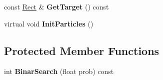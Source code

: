 \begin{DoxyCompactItemize}
\item 
\hypertarget{classParticleFilter_ab2c226ecb5b701d7cac2c99cf6168e05}{}const \hyperlink{classRect}{Rect} \& {\bfseries Get\+Target} () const \label{classParticleFilter_ab2c226ecb5b701d7cac2c99cf6168e05}

\item 
\hypertarget{classParticleFilter_a0244f4fb69b92deb70aa470f2cc85ca4}{}virtual void {\bfseries Init\+Particles} ()\label{classParticleFilter_a0244f4fb69b92deb70aa470f2cc85ca4}

\end{DoxyCompactItemize}
\subsection*{Protected Member Functions}
\begin{DoxyCompactItemize}
\item 
\hypertarget{classParticleFilter_a566b57dbca5caadbf1c9dce31b3407be}{}int {\bfseries Binar\+Search} (float prob) const \label{classParticleFilter_a566b57dbca5caadbf1c9dce31b3407be}

\end{DoxyCompactItemize}
